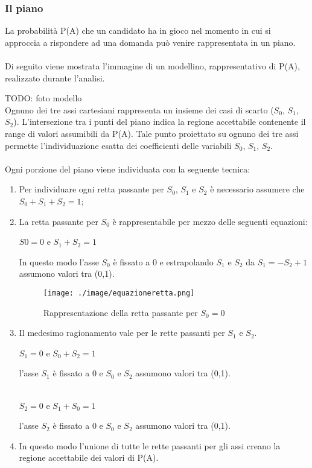 \subsubsection{Il piano}
\label{Il piano}
\noindent
La probabilit\`a P(A) che un candidato ha in gioco nel momento in cui si approccia a rispondere ad una domanda pu\`o venire rappresentata in un piano.\\\\
Di seguito viene mostrata l'immagine di un modellino, rappresentativo di P(A), realizzato durante l'analisi.

TODO: foto modello\\

\noindent
Ognuno dei tre assi cartesiani rappresenta un insieme dei casi di scarto ($S_0$, $S_1$, $S_2$). L'intersezione tra i punti del piano indica la regione accettabile contenente il range di valori assumibili da P(A). Tale punto proiettato su ognuno dei tre assi permette l'individuazione esatta dei coefficienti delle variabili $S_0$, $S_1$, $S_2$.\\\\
Ogni porzione del piano viene individuata con la seguente tecnica:
\begin{enumerate}
\item Per individuare ogni retta passante per $S_0$, $S_1$ e $S_2$ \`e necessario assumere che $S_0+S_1+S_2=1$;
\item La retta passante per $S_0$ \`e rappresentabile per mezzo delle seguenti equazioni:
\begin{center}$S0=0$ e $S_1+S_2=1$\end{center}
In questo modo l'asse $S_0$ \`e fissato a 0 e estrapolando $S_1$ e $S_2$ da $S_1=-S_2+1$  assumono valori tra (0,1). 
\begin{figure}[H]
\centering
	\texttt{[image: ./image/equazioneretta.png]}
	\caption{Rappresentazione della retta passante per $S_0=0$}
\end{figure}
\item Il medesimo ragionamento vale per le rette passanti per $S_1$ e $S_2$.

\begin{center}$S_1=0$ e $S_0+S_2=1$\end{center}
l'asse $S_1$ \`e fissato a 0 e $S_0$ e $S_2$ assumono valori tra (0,1).\\\\

\begin{center} $S_2=0$ e $S_1+S_0=1$ \end{center}
l'asse $S_2$ \`e fissato a 0 e $S_0$ e $S_2$ assumono valori tra (0,1).

\item In questo modo l'unione di tutte le rette passanti per gli assi creano la regione accettabile dei valori di P(A).
\end{enumerate}

